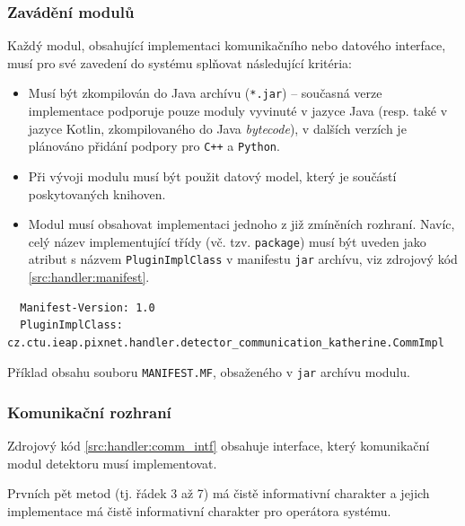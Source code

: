 \subsubsection{Zavádění modulů}\label{chap:handler:detector_layer:module_init}
Každý modul, obsahující implementaci komunikačního nebo datového interface, musí pro své zavedení do systému splňovat následující kritéria:

\begin{itemize}
	\item Musí být zkompilován do Java archívu (\texttt{*.jar}) -- současná verze implementace podporuje pouze moduly vyvinuté v jazyce Java (resp. také v jazyce Kotlin, zkompilovaného do Java \textit{bytecode}), v dalších verzích je plánováno přidání podpory pro \texttt{C++} a \texttt{Python}.
	\item Při vývoji modulu musí být použit datový model, který je součástí poskytovaných knihoven.
	\item Modul musí obsahovat implementaci jednoho z již zmíněních rozhraní. Navíc, celý název implementující třídy (vč. tzv. \texttt{package}) musí být uveden jako atribut s názvem \texttt{PluginImplClass} v manifestu \texttt{jar} archívu, viz zdrojový kód \ref{src:handler:manifest}.
\end{itemize}

\begin{code}[h!]
\begin{verbatim}
  Manifest-Version: 1.0
  PluginImplClass: cz.ctu.ieap.pixnet.handler.detector_communication_katherine.CommImpl  
\end{verbatim}
\caption{Příklad obsahu souboru \texttt{MANIFEST.MF}, obsaženého v \texttt{jar} archívu modulu.}
\label{src:handler:manifest}
\end{code}

\subsubsection{Komunikační rozhraní}\label{chap:handler:detector_layer:commIntf}
Zdrojový kód \ref{src:handler:comm_intf} obsahuje interface, který komunikační modul detektoru musí implementovat.

Prvních pět metod (tj. řádek 3 až 7) má čistě informativní charakter a jejich implementace má čistě informativní charakter pro operátora systému.

